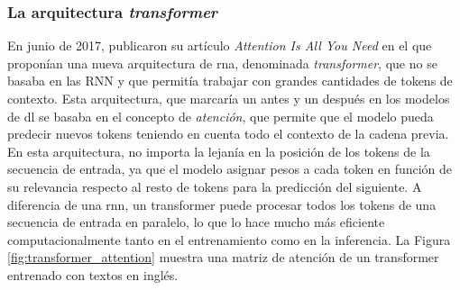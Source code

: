 \subsubsection{La arquitectura \emph{transformer}}
En junio de 2017, \citeauthor{vaswaniAttentionAllYou2017} publicaron su artículo \emph{Attention Is All You Need} \citep{vaswaniAttentionAllYou2017} en el que proponían una nueva arquitectura de \gls{rna}, denominada \emph{transformer}, que no se basaba en las RNN y que permitía trabajar con grandes cantidades de tokens de contexto. Esta arquitectura, que marcaría un antes y un después en los modelos de \gls{dl} se basaba en el concepto de \emph{atención}, que permite que el modelo pueda predecir nuevos tokens teniendo en cuenta todo el contexto de la cadena previa. En esta arquitectura, no importa la lejanía en la posición de los tokens de la secuencia de entrada, ya que el modelo asignar pesos a cada token en función de su relevancia respecto al resto de tokens para la predicción del siguiente. A diferencia de una \gls{rnn}, un transformer puede procesar todos los tokens de una secuencia de entrada en paralelo, lo que lo hace mucho más eficiente computacionalmente tanto en el entrenamiento como en la inferencia. La Figura \ref{fig:transformer_attention} muestra una matriz de atención de un transformer entrenado con textos en inglés.



